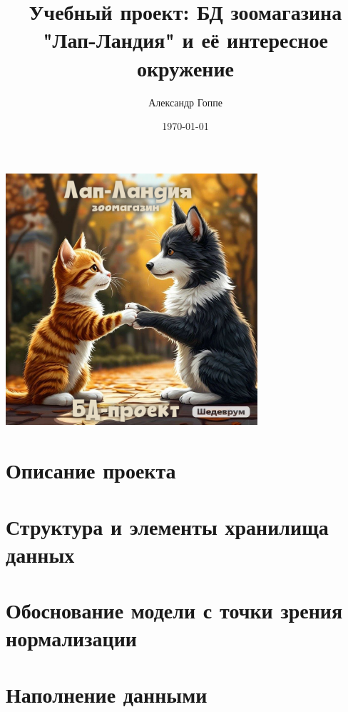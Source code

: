 \documentclass[a4paper,12pt]{article}
\title{Учебный проект: БД зоомагазина "Лап-Ландия" и её интересное окружение}
\author{Александр Гоппе}
\date{}
\begin{document}
    \maketitle

    \begin{center}
        \includegraphics[width=0.7\textwidth]{title} %
    \end{center}

    \vfill
    \begin{center}
        \date{\today}
    \end{center}
    \newpage

    \tableofcontents
    \newpage


    \section{Описание проекта}\label{sec:projectdesc}
    


    \section{Структура и элементы хранилища данных}\label{sec:dbstructure}
    


    \section{Обоснование модели с точки зрения нормализации}\label{sec:normalization}
    


    \section{Наполнение данными}\label{sec:datafilling}
    
\end{document}
